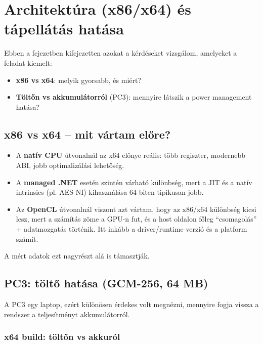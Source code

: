 \chapter{Architektúra (x86/x64) és tápellátás hatása}

Ebben a fejezetben kifejezetten azokat a kérdéseket vizsgálom, amelyeket a feladat kiemelt:

\begin{itemize}
  \item \textbf{x86 vs x64}: melyik gyorsabb, és miért?
  \item \textbf{Töltőn vs akkumulátorról} (PC3): mennyire látszik a power management hatása?
\end{itemize}

\section{x86 vs x64 -- mit vártam előre?}

\begin{itemize}
  \item A \textbf{natív CPU} útvonalnál az x64 előnye reális: több regiszter, modernebb ABI, jobb optimalizálási lehetőség.
  \item A \textbf{managed .NET} esetén szintén várható különbség, mert a JIT és a natív intrinsics (pl. AES-NI) kihasználása 64 biten tipikusan jobb.
  \item Az \textbf{OpenCL} útvonalnál viszont azt vártam, hogy az x86/x64 különbség kicsi lesz, mert a számítás zöme a GPU-n fut,
        és a host oldalon főleg ``csomagolás'' + adatmozgatás történik. Itt inkább a driver/runtime verzió és a platform számít.
\end{itemize}

A mért adatok ezt nagyrészt alá is támasztják.

\section{PC3: töltő hatása (GCM-256, 64 MB)}

A PC3 egy laptop, ezért különösen érdekes volt megnézni, mennyire fogja vissza a rendszer a teljesítményt akkumulátorról.

\subsection{x64 build: töltőn vs akkuról}

